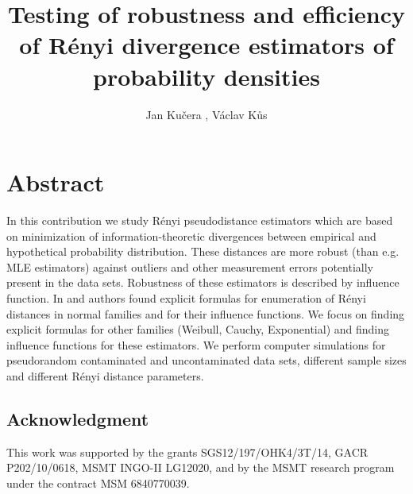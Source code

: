 \documentclass[vecphys]{svmult}
\begin{document}
\title*{\textcolor{fialova}{Testing of robustness and efficiency of Rényi divergence estimators of probability densities}}
\author{Jan Kučera ,  Václav Kůs }
\maketitle


\section*{Abstract} %

In this contribution we study Rényi pseudodistance estimators which are based on minimization of information-theoretic divergences between empirical and hypothetical probability distribution. These distances are more robust (than e.g. MLE estimators) against outliers and other measurement errors potentially present in the data sets. Robustness of these estimators is described by influence function. In \cite{Vajda2009} and \cite{Demut2010} authors found explicit formulas for enumeration of Rényi distances in normal families and for their influence functions. We focus on finding explicit formulas for other families (Weibull, Cauchy, Exponential) and finding influence functions for these estimators. 
We perform computer simulations for pseudorandom contaminated and uncontaminated data sets, different sample sizes and different Rényi distance parameters. 

\small
\subsection*{Acknowledgment}
This work was supported by the grants SGS12/197/OHK4/3T/14, GACR P202/10/0618, MSMT INGO-II LG12020, and by the MSMT research program under the contract MSM 6840770039.
\end{document}
